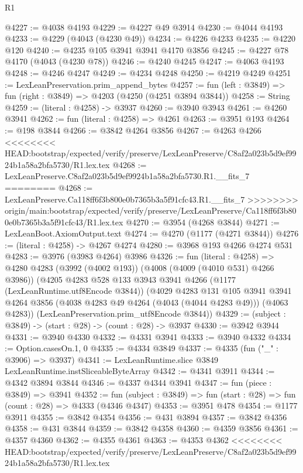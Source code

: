 \begin{lexlean}{R1}
\begin{coremodule}
{{{{{{{{{{{{{{{{{{{{{{{{{{{{{{{{{{{{{{{{{{{{{{{{{{{{{{{{{{{{{{{{{{{{{{{{{{{{{{{{{{{{{{{{{{{{{{{{{{{{{{{{{{{{{{{{{{{{{{{{{{{{{{{{{{{{{{{{{{{{{{{{{{{{{{{{{{{{{{{{{{{{{{{{{{{{{{{{{{{{{{{{{{@4227 := @4038 @4193
@4229 := @4227 @49 @3914
@4230 := @4044 @4193
@4233 := @4229 (@4043 (@4230 @49))
@4234 := @4226 @4233
@4235 := @4220 @120
@4240 := @4235 @105 @3941 @3941 @4170 @3856
@4245 := @4227 @78 @4170 (@4043 (@4230 @78))
@4246 := @4240 @4245
@4247 := @4063 @4193
@4248 := @4246 @4247
@4249 := @4234 @4248
@4250 := @4219 @4249
@4251 := LexLeanPreservation.prim_append_bytes
@4257 := fun (left : @3849) => fun (right : @3849) => @4203 (@4250 (@4251 @3894 @3844))
@4258 := String
@4259 := (literal : @4258) -> @3937
@4260 := @3940 @3943
@4261 := @4260 @3941
@4262 := fun (literal : @4258) => @4261
@4263 := @3951 @193
@4264 := @198 @3844
@4266 := @3842 @4264 @3856
@4267 := @4263 @4266
<<<<<<<< HEAD:bootstrap/expected/verify/preserve/LexLeanPreserve/C8af2a023b5d9ef9924b1a58a2bfa5730/R1.lex.tex
@4268 := LexLeanPreserve.C8af2a023b5d9ef9924b1a58a2bfa5730.R1.__fits_7
========
@4268 := LexLeanPreserve.Ca118ff6f3b800e0b7365b3a5f91cfc43.R1.__fits_7
>>>>>>>> origin/main:bootstrap/expected/verify/preserve/LexLeanPreserve/Ca118ff6f3b800e0b7365b3a5f91cfc43/R1.lex.tex
@4270 := @3954 (@4268 @3844)
@4271 := LexLeanBoot.AxiomOutput.text
@4274 := @4270 (@1177 (@4271 @3844))
@4276 := (literal : @4258) -> @4267 @4274
@4280 := @3968 @193 @4266 @4274 @531
@4283 := @3976 (@3983 @4264) @3986
@4326 := fun (literal : @4258) =>
  @4280
    @4283
    (@3992 (@4002 @193))
    (@4008 (@4009 (@4010 @531) @4266 @3986))
    (@4205
      @4283
      @528
      @133
      @3943
      @3941
      @4266
      (@1177 (LexLeanRuntime.utf8Encode @3844))
      (@4029
        @4283
        @131
        @105
        @3941
        @3941
        @4264
        @3856
        (@4038 @4283 @49 @4264 (@4043 (@4044 @4283 @49)))
        (@4063 @4283))
      (LexLeanPreservation.prim_utf8Encode @3844))
@4329 := (subject : @3849) -> (start : @28) -> (count : @28) -> @3937
@4330 := @3942 @3944
@4331 := @3940 @4330
@4332 := @4331 @3941
@4333 := @3940 @4332
@4334 := Option.casesOn.{1, 0}
@4335 := @4334 @3849
@4337 := @4335 (fun ("_" : @3906) => @3937)
@4341 := LexLeanRuntime.slice @3849 LexLeanRuntime.instSliceableByteArray
@4342 := @4341 @3911
@4344 := @4342 @3894 @3844
@4346 := @4337 @4344 @3941
@4347 := fun (piece : @3849) => @3941
@4352 := fun (subject : @3849) => fun (start : @28) => fun (count : @28) => @4333 (@4346 @4347)
@4353 := @3951 @478
@4354 := @1177 @3911
@4355 := @3842 @4354
@4356 := @431 @3894
@4357 := @3842 @4356
@4358 := @431 @3844
@4359 := @3842 @4358
@4360 := @4359 @3856
@4361 := @4357 @4360
@4362 := @4355 @4361
@4363 := @4353 @4362
<<<<<<<< HEAD:bootstrap/expected/verify/preserve/LexLeanPreserve/C8af2a023b5d9ef9924b1a58a2bfa5730/R1.lex.tex
}}}}}}}}}}}}}}}}}}}}}}}}}}}}}}}}}}}}}}}}}}}}}}}}}}}}}}}}}}}}}}}}}}}}}}}}}}}}}}}}}}}}}}}}}}}}}}}}}}}}}}}}}}}}}}}}}}}}}}}}}}}}}}}}}}}}}}}}}}}}}}}}}}}}}}}}}}}}}}}}}}}}}}}}}}}}}}}}}}}}}}}}}}
\end{coremodule}
\end{lexlean}
